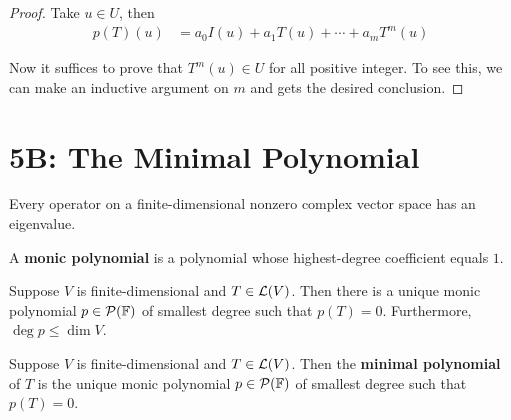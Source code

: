 \documentclass{extarticle}
\begin{document}
\begin{proof}
Take \(u \in U\), then 
\begin{align*}
    p(T)(u) 
    &= a_0I(u) + a_1T(u) + \cdots + a_m T^m(u)
\end{align*}

Now it suffices to prove that \(T^m(u) \in U\) for all positive integer. To see this, we can make an inductive 
argument on \(m\) and gets the desired conclusion.
\end{proof}




\newpage 
\section*{5B: The Minimal Polynomial}

\begin{thm}
    Every operator on a finite-dimensional nonzero complex vector space has an eigenvalue. 
\end{thm}

\begin{definition}
    A \textbf{monic polynomial} is a polynomial whose highest-degree coefficient 
    equals \(1\). 
\end{definition}

\begin{thm}
    Suppose \(V\) is finite-dimensional and \(T \in \mathcal{L}(V)\). Then there is a unique 
    monic polynomial \(p \in \mathcal{P}(\mathbb{F})\) of smallest degree such that \(p(T) = 0\). 
    Furthermore, \(\deg p \leq \dim V\). 
\end{thm}

\begin{definition}
    Suppose \(V\) is finite-dimensional and \(T \in \mathcal{L}(V)\). Then the \textbf{minimal polynomial} of \(T\)
    is the unique monic polynomial \(p \in \mathcal{P}(\mathbb{F})\) of smallest degree such that \(p(T) = 0\).
\end{definition}
\end{document}
